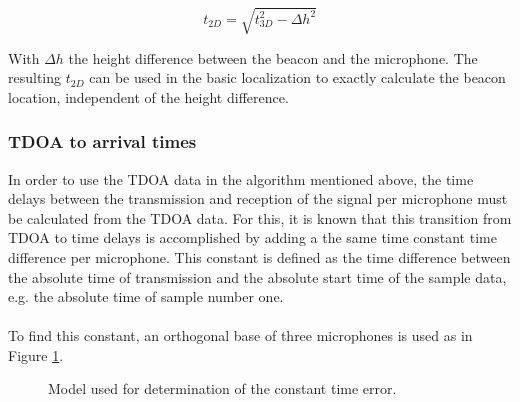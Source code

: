 \documentclass[final]{scrreprt} %
\begin{document}
\begin{equation}
	t_{2D} = \sqrt{t_{3D}^2 - \Delta h^2}
\end{equation}

With $\Delta h$ the height difference between the beacon and the microphone.
The resulting $t_{2D}$ can be used in the basic localization to exactly calculate the beacon location, independent of the height difference.

\subsubsection*{TDOA to arrival times}
In order to use the TDOA data in the algorithm mentioned above, the time delays between the transmission and reception of the signal per microphone must be calculated from the TDOA data.
For this, it is known that this transition from TDOA to time delays is accomplished by adding a the same time constant time difference per microphone.
This constant is defined as the time difference between the absolute time of transmission and the absolute start time of the sample data, e.g. the absolute time of sample number one.
\\ \\
To find this constant, an orthogonal base of three microphones is used as in Figure \ref{fig:constant}.

\begin{figure} [H]
\centering
	\caption{Model used for determination of the constant time error.}
	\label{fig:constant}
\end{figure}
\end{document}
